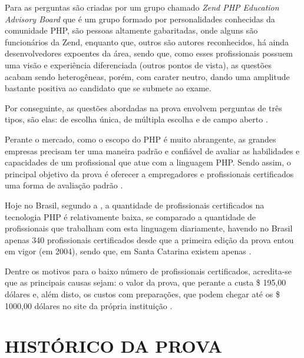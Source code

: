 Para  as perguntas são criadas por um grupo
chamado \textit{Zend PHP Education Advisory Board} que é um grupo formado por 
personalidades conhecidas da comunidade PHP, são pessoas altamente gabaritadas, 
onde alguns são funcionários da Zend, enquanto que, outros são autores
reconhecidos,  há ainda desenvolvedores expoentes da área, sendo que, como esses
profissionais possuem uma visão e experiência diferenciada (outros pontos de 
vista), as questões acabam sendo heterogêneas, porém, com carater neutro, dando 
uma amplitude bastante positiva ao candidato que se submete ao exame.

Por conseguinte, as questões abordadas na prova envolvem perguntas de três
tipos, são elas: de escolha única, de múltipla escolha e de
campo aberto \cite{entrevistaAriZCEBrasil}.

Perante o mercado, como o escopo do PHP é muito abrangente, as grandes empresas
precisam ter uma maneira padrão e confiável de avaliar as habilidades e 
capacidades de um profissional que atue com a linguagem PHP. Sendo assim, o
principal objetivo da prova é oferecer a empregadores e profissionais 
certificados uma forma de avaliação padrão \cite{zendPhp5CertificationStudyGuide}.

Hoje no Brasil, segundo a , a 
quantidade de profissionais certificados na tecnologia PHP é relativamente 
baixa, se comparado a quantidade de profissionais que trabalham com esta 
linguagem diariamente, havendo no Brasil apenas 340 profissionais certificados
desde que a primeira edição da prova entou em vigor (em 2004), sendo que, em
Santa Catarina existem apenas .

Dentre os motivos para o baixo número de profissionais certificados, acredita-se
que as principais causas sejam: o valor da prova, que perante a 
 custa \$ 195,00 dólares e, além disto, 
os custos com preparações, que podem chegar até os \$ 1000,00 dólares no site da 
própria instituição \cite{websiteZendOnlineTraining}.

\section{HISTÓRICO DA PROVA}

